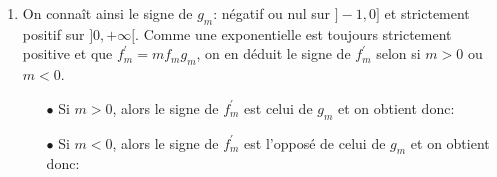 \begin{correction}
\begin{enumerate}
\begin{itemize}
\item[$\bullet$] On en d\'eduit les variations suivantes:
\begin{center}
\end{center}
\item[$\bullet$] Justifions les limites:
\begin{itemize} 
\item[$\star$] $\lim\limits_{x\to +\infty} \ddp\frac{x}{1+x}=1$ d'apr\`{e}s le th\'eor\`{e}me des monomes de plus haut degr\'e. Ainsi par propri\'et\'e sur les compos\'ee et somme de limite, on a: $\lim\limits_{x\to +\infty} g_m(x)=+\infty$.
\item[$\star$] $\lim\limits_{x\to -1^+} g_m(x)=-\infty$ par propri\'et\'es sur les quotient, comps\'ee et somme de limites.
\item[$\star$] $g_m(0)=0$.
\end{itemize}
\end{itemize}
\item On conna\^{i}t ainsi le signe de $g_m$: n\'egatif ou nul sur $\rbrack -1,0\rbrack$ et strictement positif sur $\rbrack 0,+\infty\lbrack$. Comme une exponentielle est toujours strictement positive et que $f_m^{\prime}=mf_m g_m$, on en d\'eduit le signe de $f_m^{\prime}$ selon si $m>0$ ou $m<0$.
\begin{itemize}
\item[$\bullet$] Si $m>0$, alors le signe de $f_m^{\prime}$ est celui de $g_m$ et on obtient donc:
\begin{center}
\end{center}
\item[$\bullet$] Si $m<0$, alors le signe de $f_m^{\prime}$ est l'oppos\'e de celui de $g_m$ et on obtient donc:
\begin{center}
\end{center}
\end{itemize}


\end{enumerate}
\end{correction}
